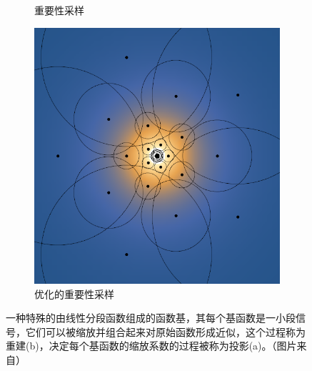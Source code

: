 \begin{figure}
\begin{fullwidth}
\begin{subfigure}[b]{0.325\thewidth}
			\caption{重要性采样}
	\end{subfigure}
	\begin{subfigure}[b]{0.325\thewidth}
		\includegraphics[width=\textwidth]{figures/pl/sampling-optimized}
			\caption{优化的重要性采样}
	\end{subfigure}
	\caption{一种特殊的由线性分段函数组成的函数基，其每个基函数是一小段信号，它们可以被缩放并组合起来对原始函数形成近似，这个过程称为重建(b)，决定每个基函数的缩放系数的过程被称为投影(a)。（图片来自\cite{a:FastFilteringofReflectionProbes}）}
	\label{f:pl-sampling-comparation}
\end{fullwidth}
\end{figure}





